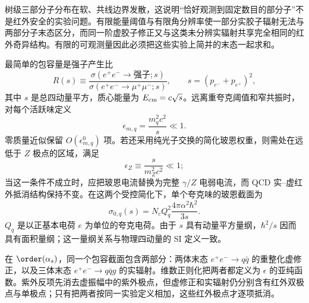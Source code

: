 树级三部分子分布在软、共线边界发散，这说明“恰好观测到固定数目的部分子”不是红外安全的实验问题。有限能量阈值与有限角分辨率使一部分实胶子辐射无法与两部分子末态区分，而同一阶虚胶子修正又与这类未分辨实辐射共享完全相同的红外奇异结构。有限的可观测量因此必须把这些实验上简并的末态一起求和。

最简单的包容量是强子产生比
\begin{equation*}
 R(s)\equiv
 \frac{\sigma(e^+e^-\to\text{强子};s)}
 {\sigma(e^+e^-\to\mu^+\mu^-;s)},
 \qquad
 s=(p_{e^-}+p_{e^+})^2,
\end{equation*}
其中 $s$ 是总四动量平方，质心能量为 $E_{\rm cm}=c\sqrt s$。远离重夸克阈值和窄共振时，对每个活跃味定义
\begin{equation*}
 \epsilon_{m,q}=\frac{m_q^2c^2}{s}\ll1.
\end{equation*}
零质量近似保留 $O(\epsilon_{m,q}^0)$ 项。若还采用纯光子交换的简化玻恩权重，则需处在远低于 $Z$ 极点的区域，满足
\begin{equation*}
 \epsilon_Z\equiv\frac{s}{m_Z^2c^2}\ll1;
\end{equation*}
当这一条件不成立时，应把玻恩电流替换为完整 $\gamma/Z$ 电弱电流，而 QCD 实--虚红外抵消结构保持不变。在这两个受控简化下，单个夸克味的玻恩截面为
\begin{equation}
 \boxed{
 \sigma_{0,q}(s)
 =N_cQ_q^2\frac{4\pi\alpha^2\hbar^2}{3s}.}
 \label{eq:qcd-r-born-sigma-si-dp12}
\end{equation}
$Q_q$ 是以正基本电荷 $e$ 为单位的夸克电荷。由于 $s$ 具有动量平方量纲，$\hbar^2/s$ 因而具有面积量纲；这一量纲关系与物理四动量的 SI 定义一致。

在 $\order(\alpha_s)$，同一个包容截面包含两部分：两体末态 $e^+e^-\to q\bar q$ 的重整化虚修正，以及三体末态 $e^+e^-\to q\bar qg$ 的实辐射。维数正则化把两者都定义为 $\epsilon$ 的亚纯函数。紫外反项先消去虚振幅中的紫外极点，但虚修正和实辐射仍分别含有红外双极点与单极点；只有把两者按同一实验定义相加，这些红外极点才逐项抵消。

